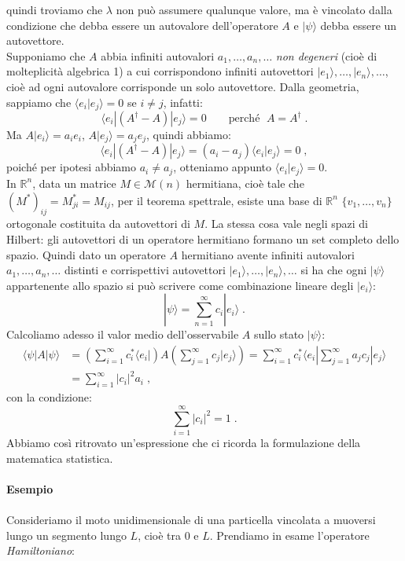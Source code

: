 \documentclass[12pt,a4paper]{report}
\theoremstyle{definition}
\numberwithin{equation}{section}
\newcommand{\bra}{\langle}
\newcommand{\ket}{\rangle}
\begin{document}
quindi troviamo che $\lambda$ non può assumere qualunque valore, ma è vincolato dalla condizione che debba essere un autovalore 
dell'operatore $A$ e $|\psi\ket$ debba essere un autovettore. \\
Supponiamo che $A$ abbia infiniti autovalori $a_1,\ldots,a_n,\ldots$ \textit{non degeneri} (cioè di molteplicità algebrica 1) a cui 
corrispondono infiniti autovettori $|e_1\ket,\ldots,|e_n\ket,\ldots$, cioè ad ogni autovalore corrisponde un solo autovettore. Dalla 
geometria, sappiamo che $\bra e_i|e_j\ket=0$ se $i\ne j$, infatti:
$$
\bra e_i|(A^{\dagger}-A)|e_j\ket=0 \qquad \mbox{perché }\; A=A^{\dagger}\;.
$$
Ma $A|e_i\ket=a_ie_i$, $A|e_j\ket=a_je_j$, quindi abbiamo:
$$
\bra e_i|(A^{\dagger}-A)|e_j\ket=(a_i-a_j)\bra e_i|e_j\ket=0\;,
$$
poiché per ipotesi abbiamo $a_i\ne a_j$, otteniamo appunto $\bra e_i|e_j\ket=0$. \\
In $\mathbb{R}^n$, data un matrice $M\in\mathcal{M}(n)$ hermitiana, cioè tale che $(M^*)_{ij}=M^*_{ji}=M_{ij}$, per il teorema spettrale, esiste una base di $\mathbb{R}^n$ $\{v_1,\ldots,v_n\}$ ortogonale costituita da autovettori di $M$. La stessa cosa vale negli spazi di Hilbert: gli autovettori di un operatore hermitiano formano un set completo dello spazio. Quindi dato un operatore $A$ hermitiano avente infiniti autovalori $a_1,\ldots,a_n,\ldots$ distinti e corrispettivi autovettori $|e_1\ket,\ldots,|e_n\ket,\ldots$ si ha che ogni $|\psi\ket$ appartenente allo spazio si può scrivere come combinazione lineare degli $|e_i\ket$:
$$
|\psi\ket=\sum_{n=1}^{\infty} c_i|e_i\ket\;.
$$
Calcoliamo adesso il valor medio dell'osservabile $A$ sullo stato $|\psi\ket$:
\begin{align*}
\bra\psi|A|\psi\ket &= \left(\sum_{i=1}^{\infty} c_i^* \bra e_i|\right)A\left(\sum_{j=1}^{\infty} c_j|e_j\ket\right)= \sum_{i=1}^{\infty} c_i^* \bra e_i|\sum_{j=1}^{\infty} a_jc_j|e_j\ket \\
&= \sum_{i=1}^{\infty} |c_i|^2a_i\;,
\end{align*}
con la condizione:
\begin{equation}
\sum_{i=1}^{\infty} |c_i|^2 =1\;.
\end{equation}
Abbiamo così ritrovato un'espressione che ci ricorda la formulazione della matematica statistica. \\
\\
\textbf{Esempio} \\
\\
Consideriamo il moto unidimensionale di una particella vincolata a muoversi lungo un segmento lungo $L$, cioè tra 0 e $L$. Prendiamo in esame l'operatore \textit{Hamiltoniano}:
\end{document}
